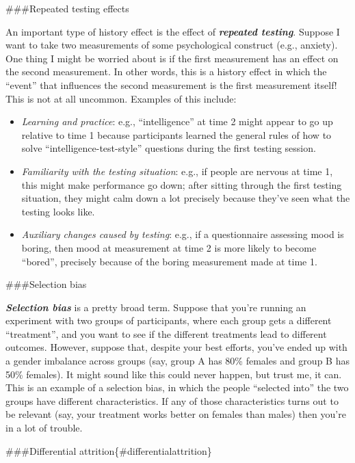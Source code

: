 \documentclass[]{book}
\providecommand{\tightlist}{%
  \setlength{\itemsep}{0pt}\setlength{\parskip}{0pt}}
\begin{document}
\#\#\#Repeated testing effects

An important type of history effect is the effect of \textbf{\emph{repeated testing}}. Suppose I want to take two measurements of some psychological construct (e.g., anxiety). One thing I might be worried about is if the first measurement has an effect on the second measurement. In other words, this is a history effect in which the ``event'' that influences the second measurement is the first measurement itself! This is not at all uncommon. Examples of this include:

\begin{itemize}
\tightlist
\item
  \emph{Learning and practice}: e.g., ``intelligence'' at time 2 might appear to go up relative to time 1 because participants learned the general rules of how to solve ``intelligence-test-style'' questions during the first testing session.\\
\item
  \emph{Familiarity with the testing situation}: e.g., if people are nervous at time 1, this might make performance go down; after sitting through the first testing situation, they might calm down a lot precisely because they've seen what the testing looks like.
\item
  \emph{Auxiliary changes caused by testing}: e.g., if a questionnaire assessing mood is boring, then mood at measurement at time 2 is more likely to become ``bored'', precisely because of the boring measurement made at time 1.
\end{itemize}

\#\#\#Selection bias

\textbf{\emph{Selection bias}} is a pretty broad term. Suppose that you're running an experiment with two groups of participants, where each group gets a different ``treatment'', and you want to see if the different treatments lead to different outcomes. However, suppose that, despite your best efforts, you've ended up with a gender imbalance across groups (say, group A has 80\% females and group B has 50\% females). It might sound like this could never happen, but trust me, it can. This is an example of a selection bias, in which the people ``selected into'' the two groups have different characteristics. If any of those characteristics turns out to be relevant (say, your treatment works better on females than males) then you're in a lot of trouble.

\#\#\#Differential attrition\{\#differentialattrition\}
\end{document}
